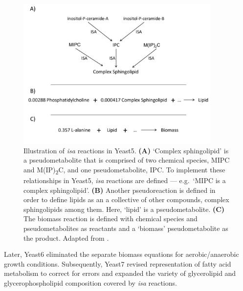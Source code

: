 \begin{figure}
  \centering
  \includegraphics[width=0.9\textwidth]{heavnerYeastExpandedReconstruction2012_1}
  \caption[
    Illustration of \textit{isa} reactions in Yeast5.
  ]{
    Illustration of \textit{isa} reactions in Yeast5.
    \textbf{(A)} `Complex sphingolipid' is a pseudometabolite that is comprised of two chemical species, MIPC and M(IP)\textsubscript{2}C, and one pseudometabolite, IPC\@.
    To implement these relationships in Yeast5, \textit{isa} reactions are defined --- e.g.\ `MIPC is a complex sphingolipid'.
    \textbf{(B)} Another pseudoreaction is defined in order to define lipids as an a collective of other compounds, complex sphingolipids among them.
    Here, `lipid' is a pseudometabolite.
    \textbf{(C)} The biomass reaction is defined with chemical species and pseudometabolites as reactants and a `biomass' pseudometabolite as the product.
    Adapted from \textcite{heavnerYeastExpandedReconstruction2012}.
    }
  \label{fig:intro-fba-isa}
\end{figure}

Later, Yeast6 \parencite{heavnerVersionConsensusYeast2013} eliminated the separate biomass equations for aerobic/anaerobic growth conditions.
Subsequently, Yeast7 \parencite{aungRevisingRepresentationFatty2013} revised representation of fatty acid metabolism to correct for errors and expanded the variety of glycerolipid and glycerophospholipid composition covered by \textit{isa} reactions.


